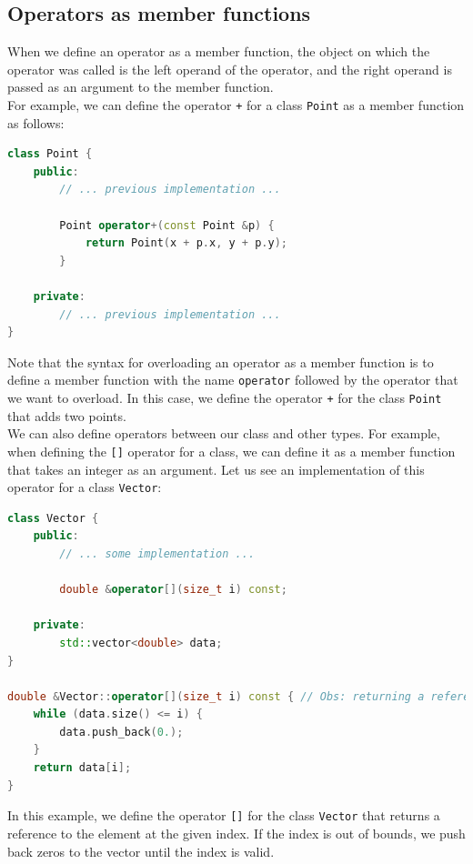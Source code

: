 \subsection{Operators as member functions}

When we define an operator as a member function, the object on which the operator
was called is the left operand of the operator, and the right operand is passed as
an argument to the member function.\\

For example, we can define the operator \texttt{+} for a class \texttt{Point} as a
member function as follows:\\

\begin{lstlisting}[language=C++]
class Point {
    public:
        // ... previous implementation ...

        Point operator+(const Point &p) {
            return Point(x + p.x, y + p.y);
        }

    private:
        // ... previous implementation ...
}
\end{lstlisting}

Note that the syntax for overloading an operator as a member function is to define
a member function with the name \texttt{operator} followed by the operator that we
want to overload. In this case, we define the operator \texttt{+} for the class
\texttt{Point} that adds two points.\\

We can also define operators between our class and other types. For example, when defining
the \texttt{[]} operator for a class, we can define it as a member function that takes
an integer as an argument. Let us see an implementation of this operator for a class
\texttt{Vector}:\\

\begin{lstlisting}[language=C++]
class Vector {
    public:
        // ... some implementation ...

        double &operator[](size_t i) const;

    private:
        std::vector<double> data;
}

double &Vector::operator[](size_t i) const { // Obs: returning a reference
    while (data.size() <= i) {
        data.push_back(0.);
    }
    return data[i];
}
\end{lstlisting}

In this example, we define the operator \texttt{[]} for the class \texttt{Vector} that
returns a reference to the element at the given index. If the index is out of bounds,
we push back zeros to the vector until the index is valid.\\

